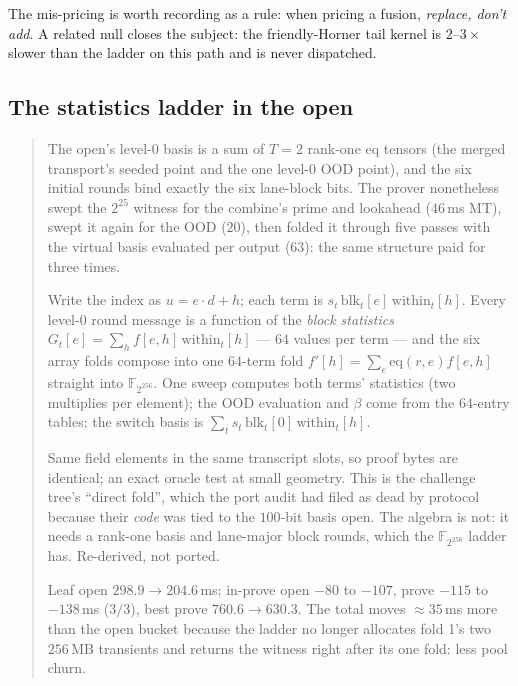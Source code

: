 \documentclass[11pt]{article}
\newcommand{\eq}{\mathrm{eq}}
\newenvironment{optsummary}{%
  \begin{quote}\small
  \begin{description}
  \setlength{\itemsep}{1pt}\setlength{\parsep}{0pt}\setlength{\topsep}{2pt}
}{%
  \end{description}
  \end{quote}
}
\begin{document}
The mis-pricing is worth recording as a rule: when pricing a fusion,
\emph{replace, don't add}. A related null closes the subject: the
friendly-Horner tail kernel is $2$--$3\times$ slower than the ladder on
this path and is never dispatched.

\subsection{The statistics ladder in the open}\label{sec:statsladder}

\begin{optsummary}
\item[Baseline:] The open's level-0 basis is a sum of $T{=}2$ rank-one eq tensors (the merged transport's seeded point and the one level-0 OOD point), and the six initial rounds bind exactly the six lane-block bits. The prover nonetheless swept the $2^{25}$ witness for the combine's prime and lookahead ($46\,$ms MT), swept it again for the OOD ($20$), then folded it through five passes with the virtual basis evaluated per output ($63$): the same structure paid for three times.
\item[Improvement:] Write the index as $u = e\cdot d + h$; each term is $s_t\,\mathrm{blk}_t[e]\,\mathrm{within}_t[h]$. Every level-0 round message is a function of the \emph{block statistics} $G_t[e] = \sum_h f[e,h]\,\mathrm{within}_t[h]$ --- $64$ values per term --- and the six array folds compose into one $64$-term fold $f'[h] = \sum_e \eq(r,e) f[e,h]$ straight into $\mathbb{F}_{2^{256}}$. One sweep computes both terms' statistics (two multiplies per element); the OOD evaluation and $\beta$ come from the $64$-entry tables; the switch basis is $\sum_t s_t\,\mathrm{blk}_t[0]\,\mathrm{within}_t[h]$.
\item[Mechanism:] Same field elements in the same transcript slots, so proof bytes are identical; an exact oracle test at small geometry. This is the challenge tree's ``direct fold'', which the port audit had filed as dead by protocol because their \emph{code} was tied to the $100$-bit basis open. The algebra is not: it needs a rank-one basis and lane-major block rounds, which the $\mathbb{F}_{2^{256}}$ ladder has. Re-derived, not ported.
\item[Result:] Leaf open $298.9\to204.6\,$ms; in-prove open $-80$ to $-107$, prove $-115$ to $-138\,$ms ($3/3$), best prove $760.6\to630.3$. The total moves $\approx35\,$ms more than the open bucket because the ladder no longer allocates fold 1's two $256\,$MB transients and returns the witness right after its one fold: less pool churn.
\end{optsummary}
\end{document}
